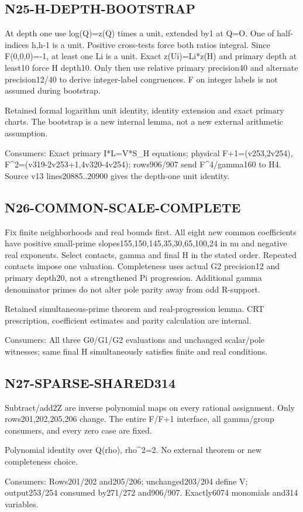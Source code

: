 \documentclass{article}
\begin{document}
\subsection{N25-H-DEPTH-BOOTSTRAP}
\label{outline:r4-n25-h-depth-bootstrap}
At depth one use log(Q)=z(Q) times a unit, extended by1 at Q=O. One of half-indices h,h-1 is a unit. Positive cross-tests force both ratios integral. Since F(0,0,0)=-1, at least one Li is a unit. Exact z(Ui)=Li*z(H) and primary depth at least10 force H depth10. Only then use relative primary precision40 and alternate precision12/40 to derive integer-label congruences. F on integer labels is not assumed during bootstrap.
\par Retained formal logarithm unit identity, identity extension and exact primary charts. The bootstrap is a new internal lemma, not a new external arithmetic assumption.
\par Consumers: Exact primary I*L=V*S\_H equations; physical F+1=(v253,2v254), F\textasciicircum{}2=(v319-2v253+1,4v320-4v254); rows906/907 send F\textasciicircum{}4/gamma160 to H4. Source v13 lines20885..20900 gives the depth-one unit identity.
\subsection{N26-COMMON-SCALE-COMPLETE}
\label{outline:r4-n26-common-scale-complete}
Fix finite neighborhoods and real bounds first. All eight new common coefficients have positive small-prime slopes155,150,145,35,30,65,100,24 in nu and negative real exponents. Select contacts, gamma and final H in the stated order. Repeated contacts impose one valuation. Completeness uses actual G2 precision12 and primary depth20, not a strengthened Pi progression. Additional gamma denominator primes do not alter pole parity away from odd R-support.
\par Retained simultaneous-prime theorem and real-progression lemma. CRT prescription, coefficient estimates and parity calculation are internal.
\par Consumers: All three G0/G1/G2 evaluations and unchanged scalar/pole witnesses; same final H simultaneously satisfies finite and real conditions.
\subsection{N27-SPARSE-SHARED314}
\label{outline:r4-n27-sparse-shared314}
Subtract/add2Z are inverse polynomial maps on every rational assignment. Only rows201,202,205,206 change. The entire F/F+1 interface, all gamma/group consumers, and every zero case are fixed.
\par Polynomial identity over Q(rho), rho\textasciicircum{}2=2. No external theorem or new completeness choice.
\par Consumers: Rows201/202 and205/206; unchanged203/204 define V; output253/254 consumed by271/272 and906/907. Exactly6074 monomials and314 variables.
\end{document}
